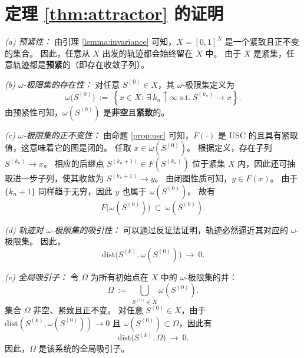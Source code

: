 \documentclass[journal]{IEEEtran}
\theoremstyle{plain}
\theoremstyle{definition}
\begin{document}
\section{定理 \ref{thm:attractor} 的证明}
\label{app:proof_thm_attractor}
\begin{IEEEproof}
\textit{(a) 预紧性：}
由引理 \ref{lemma:invariance} 可知，$X=[0,1]^N$ 是一个紧致且正不变的集合。
因此，任意从 $X$ 出发的轨迹都会始终留在 $X$ 中。
由于 $X$ 是紧集，任意轨迹都是\textbf{预紧}的（即存在收敛子列）。

\textit{(b) $\omega$-极限集的存在性：}
对任意 $S^{(0)}\in X$，其 $\omega$-极限集定义为
\begin{equation}
\omega\big(S^{(0)}\big)\ :=\ \left\{x\in X:\ \exists\,k_n\uparrow\infty\ \text{s.t.}\ S^{(k_n)}\to x\right\}.
\end{equation}
由预紧性可知，$\omega(S^{(0)})$ 是\textbf{非空}且\textbf{紧致}的。

\textit{(c) $\omega$-极限集的正不变性：}
由命题 \ref{prop:usc} 可知，$F(\cdot)$ 是 USC 的且具有紧取值，这意味着它的图是闭的。
任取 $x \in \omega(S^{(0)})$。
根据定义，存在子列 $S^{(k_n)} \to x$。
相应的后继点 $S^{(k_n+1)} \in F(S^{(k_n)})$ 位于紧集 $X$ 内，因此还可抽取进一步子列，使其收敛为 $S^{(k_n+1)} \to y$。
由闭图性质可知，$y \in F(x)$。
由于 $\{k_n+1\}$ 同样趋于无穷，因此 $y$ 也属于 $\omega(S^{(0)})$。
故有
\begin{equation}
F\big(\omega(S^{(0)})\big)\ \subset\ \omega(S^{(0)}).
\end{equation}

\textit{(d) 轨迹对 $\omega$-极限集的吸引性：}
可以通过反证法证明，轨迹必然逼近其对应的 $\omega$-极限集。
因此，
\begin{equation}
\mathrm{dist}\big(S^{(k)},\omega(S^{(0)})\big)\ \to\ 0.
\end{equation}

\textit{(e) 全局吸引子：}
令 $\Omega$ 为所有初始点在 $X$ 中的 $\omega$-极限集的并：
\begin{equation}
\Omega\ :=\ \bigcup_{S^{(0)}\in X} \omega(S^{(0)}).
\end{equation}
集合 $\Omega$ 非空、紧致且正不变。
对任意 $S^{(0)}\in X$，由于 $\mathrm{dist}(S^{(k)},\omega(S^{(0)}))\to 0$ 且 $\omega(S^{(0)})\subset\Omega$，因此有
\begin{equation}
\mathrm{dist}\big(S^{(k)},\Omega\big)\ \to\ 0.
\end{equation}
因此，$\Omega$ 是该系统的全局吸引子。
\end{IEEEproof}
\end{document}
